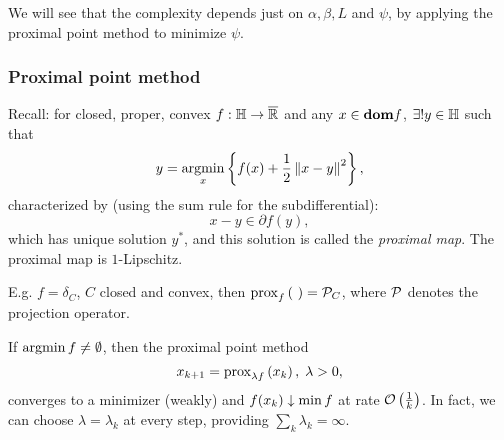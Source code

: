 We will see that the complexity depends just on $\alpha, \beta, L$ and $\psi$,
by applying the proximal point method to minimize $\psi$.

\subsubsection{Proximal point method}
Recall: for closed, proper, convex $f: \mathbb{H} \to \overline{\mathbb{R}}$ and any $x \in
\textbf{dom} f$, $\exists! y \in \mathbb{H}$ such that
\[
	y = \operatorname*{argmin}_x \left\{ f(x) + \frac{1}{2} \left \| x - y \right \|^2 \right\},
\]
characterized by (using the sum rule for the subdifferential):
\[
	x - y \in \partial f(y),
\]
which has unique solution $y^*$, and this solution is called the
\textit{proximal map}. The proximal map is $1$-Lipschitz.

E.g. $f = \delta_C$, $C$ closed and convex, then $\mathrm{prox}_{f}\left( ~ \right) = \mathcal{P}_{C}$, where
$\mathcal{P}$ denotes the projection operator.

If $\operatorname*{argmin} f \neq \emptyset$, then the proximal point method
\[
	x_{k+1} = \mathrm{prox}_{\lambda f}\left( x_k \right), \; \lambda > 0,
\]
converges to a minimizer (weakly) and $f(x_k) \downarrow \min f$ at rate
$\mathcal{O}\left(\frac{1}{k}\right)$. In fact, we can choose $\lambda = \lambda_k$ at
every step, providing $\sum_k \lambda_k = \infty$.


